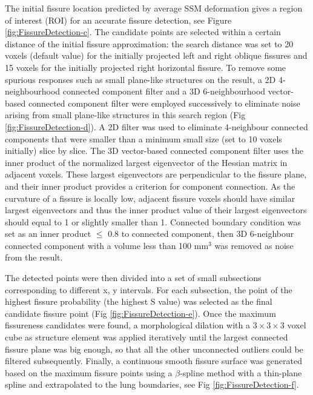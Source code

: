 \documentclass[]{spie}  %
\begin{document}
{The initial fissure location predicted by average SSM deformation gives a region of interest (ROI) for an accurate fissure detection, see Figure \ref{fig:FissureDetection-c}. The candidate points are selected within a certain distance of the initial fissure approximation: the search distance was set to 20 voxels (default value) for the initially projected left and right oblique fissures and 15 voxels for the initially projected right horizontal fissure. To remove some spurious responses such as small plane-like structures on the result, a 2D 4-neighbourhood connected component filter and a 3D 6-neighbourhood vector-based connected component filter were employed successively to eliminate noise arising from small plane-like structures in this search region (Fig \ref{fig:FissureDetection-d}). A 2D filter was used to eliminate 4-neighbour connected components that were smaller than a minimum small size (set to 10 voxels initially) slice by slice. The 3D vector-based connected component filter uses the inner product of the normalized largest eigenvector of the Hessian matrix in adjacent voxels. These largest eigenvectors are perpendicular to the fissure plane, and their inner product provides a criterion for component connection. As the curvature of a fissure is locally low, adjacent fissure voxels should have similar largest eigenvectors and thus the inner product value of their largest eigenvectors should equal to 1 or slightly smaller than 1. Connected boundary condition was set as an inner product $\leq$ 0.8 to connected component, then 3D 6-neighbour connected component with a volume less than 100 $\mathrm{mm^3}$ was removed as noise from the result.

The detected points were then divided into a set of small subsections corresponding to different x, y intervals. For each subsection, the point of the highest fissure probability (the highest S value) was selected as the final candidate fissure point (Fig \ref{fig:FissureDetection-e}). Once the maximum fissureness candidates were found, a morphological dilation with a $3\times3\times3$ voxel cube as structure element was applied iteratively until the largest connected fissure plane was big enough, so that all the other unconnected outliers could be filtered subsequently. Finally, a continuous smooth fissure surface was generated based on the maximum fissure points using a $\beta$-spline method with a thin-plane spline \cite{lee1997scattered} and extrapolated to the lung boundaries, see Fig \ref{fig:FissureDetection-f}.

}
\end{document}
